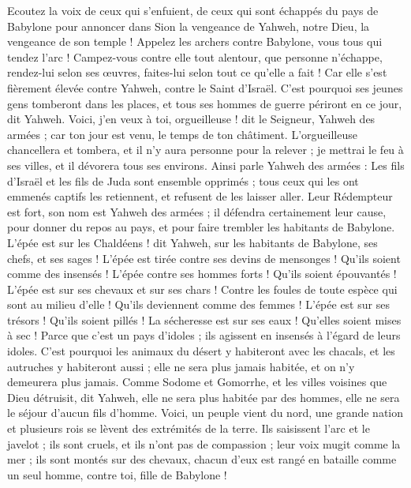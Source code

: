 \begin{multicols}{2}
Ecoutez la voix de ceux qui s'enfuient, de ceux qui sont échappés du pays de Babylone pour annoncer dans Sion la vengeance de Yahweh, notre Dieu, la vengeance de son temple !
Appelez les archers contre Babylone, vous tous qui tendez l'arc ! Campez-vous contre elle tout alentour, que personne n'échappe, rendez-lui selon ses œuvres, faites-lui selon tout ce qu'elle a fait ! Car elle s'est fièrement élevée contre Yahweh, contre le Saint d'Israël.
C'est pourquoi ses jeunes gens tomberont dans les places, et tous ses hommes de guerre périront en ce jour, dit Yahweh.
Voici, j'en veux à toi, orgueilleuse ! dit le Seigneur, Yahweh des armées ; car ton jour est venu, le temps de ton châtiment.
L’orgueilleuse chancellera et tombera, et il n'y aura personne pour la relever ; je mettrai le feu à ses villes, et il dévorera tous ses environs.
Ainsi parle Yahweh des armées : Les fils d'Israël et les fils de Juda sont ensemble opprimés ; tous ceux qui les ont emmenés captifs les retiennent, et refusent de les laisser aller.
Leur Rédempteur est fort, son nom est Yahweh des armées ; il défendra certainement leur cause, pour donner du repos au pays, et pour faire trembler les habitants de Babylone.
L'épée est sur les Chaldéens ! dit Yahweh, sur les habitants de Babylone, ses chefs, et ses sages !
L'épée est tirée contre ses devins de mensonges ! Qu’ils soient comme des insensés ! L’épée contre ses hommes forts ! Qu’ils soient épouvantés !
L'épée est sur ses chevaux et sur ses chars ! Contre les foules de toute espèce qui sont au milieu d'elle ! Qu’ils deviennent comme des femmes ! L’épée est sur ses trésors ! Qu’ils soient pillés !
La sécheresse est sur ses eaux ! Qu’elles soient mises à sec ! Parce que c'est un pays d'idoles ; ils agissent en insensés à l'égard de leurs idoles.
C'est pourquoi les animaux du désert y habiteront avec les chacals, et les autruches y habiteront aussi ; elle ne sera plus jamais habitée, et on n'y demeurera plus jamais.
Comme Sodome et Gomorrhe, et les villes voisines que Dieu détruisit, dit Yahweh, elle ne sera plus habitée par des hommes, elle ne sera le séjour d'aucun fils d'homme.
Voici, un peuple vient du nord, une grande nation et plusieurs rois se lèvent des extrémités de la terre.
Ils saisissent l'arc et le javelot ; ils sont cruels, et ils n'ont pas de compassion ; leur voix mugit comme la mer ; ils sont montés sur des chevaux, chacun d'eux est rangé en bataille comme un seul homme, contre toi, fille de Babylone !

\end{multicols}
